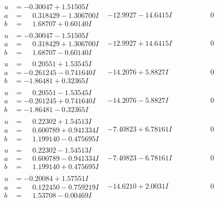 \documentclass[1p]{elsarticle_modified}
\theoremstyle{definition}
\begin{document}
$$\begin{array}{c|c|c}
\begin{aligned}
u &= -0.30047 + 1.51505 I \\
a &= \phantom{-}0.318429 - 1.306700 I \\
b &= \phantom{-}1.68707 + 0.60140 I\end{aligned}
 & -12.9927 - 14.6415 I & \phantom{-0.000000 } 0 \\ \hline\begin{aligned}
u &= -0.30047 - 1.51505 I \\
a &= \phantom{-}0.318429 + 1.306700 I \\
b &= \phantom{-}1.68707 - 0.60140 I\end{aligned}
 & -12.9927 + 14.6415 I & \phantom{-0.000000 } 0 \\ \hline\begin{aligned}
u &= \phantom{-}0.20551 + 1.53545 I \\
a &= -0.261245 - 0.741640 I \\
b &= -1.86481 + 0.32365 I\end{aligned}
 & -14.2076 + 5.8827 I & \phantom{-0.000000 } 0 \\ \hline\begin{aligned}
u &= \phantom{-}0.20551 - 1.53545 I \\
a &= -0.261245 + 0.741640 I \\
b &= -1.86481 - 0.32365 I\end{aligned}
 & -14.2076 - 5.8827 I & \phantom{-0.000000 } 0 \\ \hline\begin{aligned}
u &= \phantom{-}0.22302 + 1.54513 I \\
a &= \phantom{-}0.600789 + 0.941334 I \\
b &= \phantom{-}1.199140 - 0.475695 I\end{aligned}
 & -7.40823 + 6.78161 I & \phantom{-0.000000 } 0 \\ \hline\begin{aligned}
u &= \phantom{-}0.22302 - 1.54513 I \\
a &= \phantom{-}0.600789 - 0.941334 I \\
b &= \phantom{-}1.199140 + 0.475695 I\end{aligned}
 & -7.40823 - 6.78161 I & \phantom{-0.000000 } 0 \\ \hline\begin{aligned}
u &= -0.20084 + 1.57551 I \\
a &= \phantom{-}0.122450 - 0.759219 I \\
b &= \phantom{-}1.53708 - 0.00469 I\end{aligned}
 & -14.6210 + 2.0031 I & \phantom{-0.000000 } 0\\

\end{array}$$
\end{document}
